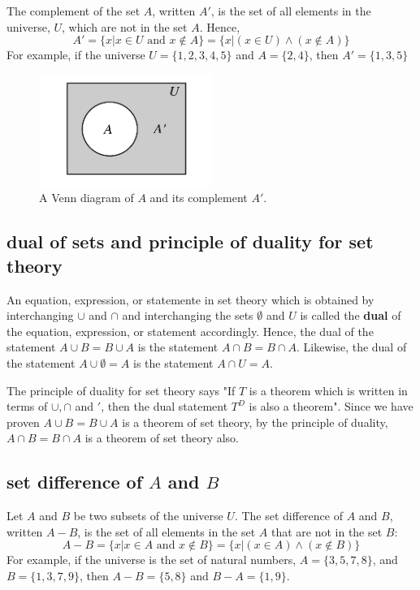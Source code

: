 \documentclass{article}
\begin{document}
    The complement of the set $A$, written $A'$, is the set of all elements in the universe, $U$, which are not in the set $A$. Hence,
    \begin{equation}
    A' = \{x | x \in U \textrm{ and } x \notin A\} = \{x | (x \in U) \wedge (x \notin A) \}
    \end{equation}
    For example, if the universe $U = \{1,2,3,4,5\}$ and $A = \{2,4\}$, then $A' = \{1,3,5\}$
    \begin{figure}[h]
    \centering
    \includegraphics[width=0.5\textwidth]{./images/set-theory-3}
    \caption{A Venn diagram of $A$ and its complement $A'$.}
    \end{figure}

    \subsection{dual of sets and principle of duality for set theory}

    An equation, expression, or statemente in set theory which is obtained by interchanging $\cup$ and $\cap$ and interchanging the sets $\emptyset$ and $U$ is called the \textbf{dual} of the equation, expression, or statement accordingly. Hence, the dual of the statement $A \cup B = B \cup A$ is the statement $A \cap B = B \cap A$. Likewise, the dual of the statement $A \cup \emptyset = A$ is the statement $A \cap U = A$.

    The principle of duality for set theory says "If $T$ is a theorem which is written in terms of $\cup,\cap$ and $'$, then the dual statement $T^D$ is also a theorem". Since we have proven $A \cup B = B \cup A$ is a theorem of set theory, by the principle of duality, $A \cap B = B \cap A$ is a theorem of set theory also.

    \subsection{set difference of $A$ and $B$}
    Let $A$ and $B$ be two subsets of the universe $U$. The set difference of $A$ and $B$, written $A - B$, is the set of all elements in the set $A$ that are not in the set $B$:
    $$
    A - B = \{x | x \in A \textrm{ and } x \notin B\} = \{x | (x \in A) \wedge (x \notin B) \}
    $$
    For example, if the universe is the set of natural numbers, $A = \{3,5,7,8\}$, and $B = \{1,3,7,9\}$, then $A - B = \{5,8\}$ and $B - A = \{1,9\}$.
\end{document}
